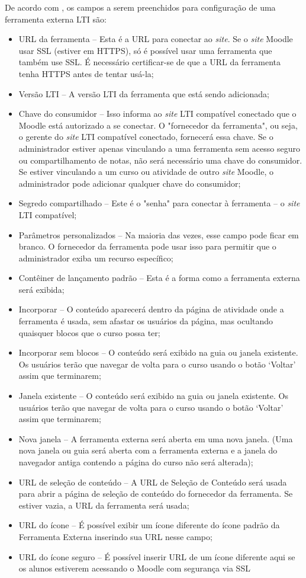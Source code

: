 De acordo com \textcite{moodle}, os campos a serem preenchidos para configuração de uma ferramenta externa LTI são:

\begin{itemize}
    \item URL da ferramenta – Esta é a URL para conectar ao \textit{site}. Se o \textit{site} Moodle usar SSL (estiver em HTTPS), só é possível usar uma ferramenta que também use SSL. É necessário certificar-se de que a URL da ferramenta tenha HTTPS antes de tentar usá-la;
    \item Versão LTI – A versão LTI da ferramenta que está sendo adicionada; 
    \item Chave do consumidor – Isso informa ao \textit{site} LTI compatível conectado que o Moodle está autorizado a se conectar. O "fornecedor da ferramenta", ou seja, o gerente do \textit{site} LTI compatível conectado, fornecerá essa chave. Se o administrador estiver apenas vinculando a uma ferramenta sem acesso seguro ou compartilhamento de notas, não será necessário uma chave do consumidor. Se estiver vinculando a um curso ou atividade de outro \textit{site} Moodle, o administrador pode adicionar qualquer chave do consumidor;
    \item Segredo compartilhado – Este é o "senha" para conectar à ferramenta – o \textit{site} LTI compatível;
    \item Parâmetros personalizados – Na maioria das vezes, esse campo pode ficar em branco. O fornecedor da ferramenta pode usar isso para permitir que o administrador exiba um recurso específico;
    \item Contêiner de lançamento padrão – Esta é a forma como a ferramenta externa será exibida;
    \item Incorporar – O conteúdo aparecerá dentro da página de atividade onde a ferramenta é usada, sem afastar os usuários da página, mas ocultando quaisquer blocos que o curso possa ter;
    \item Incorporar sem blocos – O conteúdo será exibido na guia ou janela existente. Os usuários terão que navegar de volta para o curso usando o botão ‘Voltar’ assim que terminarem;
    \item Janela existente – O conteúdo será exibido na guia ou janela existente. Os usuários terão que navegar de volta para o curso usando o botão ‘Voltar’ assim que terminarem;
    \item Nova janela – A ferramenta externa será aberta em uma nova janela. (Uma nova janela ou guia será aberta com a ferramenta externa e a janela do navegador antiga contendo a página do curso não será alterada);
    \item URL de seleção de conteúdo – A URL de Seleção de Conteúdo será usada para abrir a página de seleção de conteúdo do fornecedor da ferramenta. Se estiver vazia, a URL da ferramenta será usada;
    \item URL do ícone – É possível exibir um ícone diferente do ícone padrão da Ferramenta Externa inserindo sua URL nesse campo;
    \item URL do ícone seguro – É possível inserir URL de um ícone diferente aqui se os alunos estiverem acessando o Moodle com segurança via SSL
\end{itemize}


